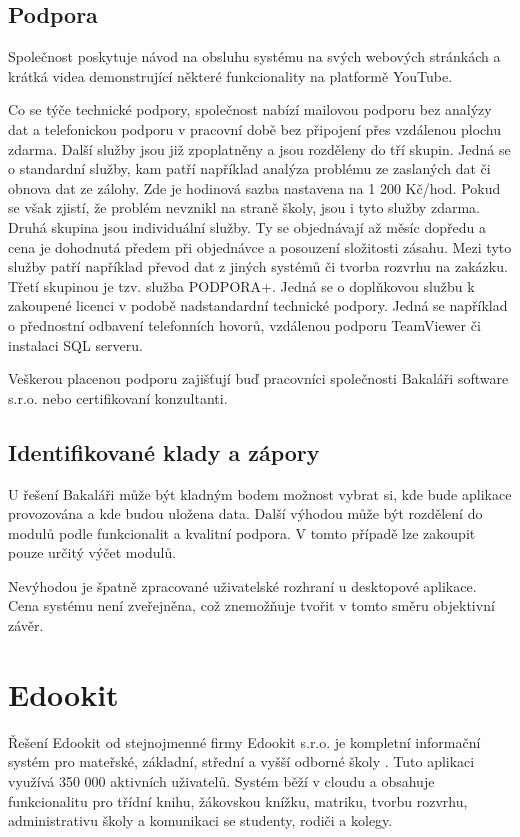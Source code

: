 \subsection{Podpora}
Společnost poskytuje návod na obsluhu systému na svých webových stránkách a krátká videa demonstrující některé funkcionality na platformě YouTube.

Co se týče technické podpory, společnost nabízí mailovou podporu bez analýzy dat a telefonickou podporu v pracovní době bez připojení přes vzdálenou plochu zdarma. Další služby jsou již zpoplatněny a jsou rozděleny do tří skupin. Jedná se o standardní služby, kam patří například analýza problému ze zaslaných dat či obnova dat ze zálohy. Zde je hodinová sazba nastavena na 1 200 Kč/hod. Pokud se však zjistí, že problém nevznikl na straně školy, jsou i tyto služby zdarma. Druhá skupina jsou individuální služby. Ty se objednávají až měsíc dopředu a cena je dohodnutá předem při objednávce a posouzení složitosti zásahu. Mezi tyto služby patří například převod dat z jiných systémů či tvorba rozvrhu na zakázku. Třetí skupinou je tzv. služba PODPORA+. Jedná se o doplňkovou službu k zakoupené licenci v podobě nadstandardní technické podpory. Jedná se například o přednostní odbavení telefonních hovorů, vzdálenou podporu TeamViewer či instalaci SQL serveru.

Veškerou placenou podporu zajišťují buď pracovníci společnosti Bakaláři software s.r.o. nebo certifikovaní konzultanti.

\subsection{Identifikované klady a zápory}
U řešení Bakaláři může být kladným bodem možnost vybrat si, kde bude aplikace provozována a kde budou uložena data. Další výhodou může být rozdělení do modulů podle funkcionalit a kvalitní podpora. V tomto případě lze zakoupit pouze určitý výčet modulů.

Nevýhodou je špatně zpracované uživatelské rozhraní u desktopové aplikace. Cena systému není zveřejněna, což znemožňuje tvořit v tomto směru objektivní závěr.

\section{Edookit}
Řešení Edookit od stejnojmenné firmy Edookit s.r.o. je kompletní informační systém pro mateřské, základní, střední a vyšší odborné školy \cite{edookit}. Tuto aplikaci využívá 350 000 aktivních uživatelů. Systém běží v cloudu a obsahuje funkcionalitu pro třídní knihu, žákovskou knížku, matriku, tvorbu rozvrhu, administrativu školy a komunikaci se studenty, rodiči a kolegy. 

